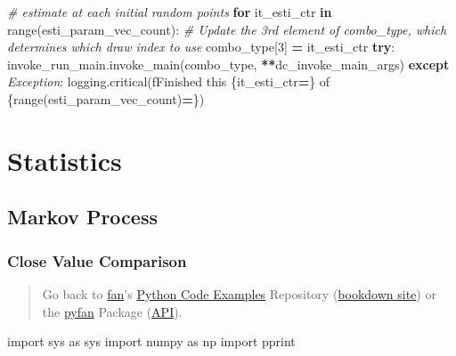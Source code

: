 \documentclass[
]{book}
\newenvironment{Shaded}{\begin{snugshade}}{\end{snugshade}}
\newcommand{\BuiltInTok}[1]{#1}
\newcommand{\CommentTok}[1]{\textcolor[rgb]{0.56,0.35,0.01}{\textit{#1}}}
\newcommand{\ControlFlowTok}[1]{\textcolor[rgb]{0.13,0.29,0.53}{\textbf{#1}}}
\newcommand{\DecValTok}[1]{\textcolor[rgb]{0.00,0.00,0.81}{#1}}
\newcommand{\ImportTok}[1]{#1}
\newcommand{\KeywordTok}[1]{\textcolor[rgb]{0.13,0.29,0.53}{\textbf{#1}}}
\newcommand{\NormalTok}[1]{#1}
\newcommand{\OperatorTok}[1]{\textcolor[rgb]{0.81,0.36,0.00}{\textbf{#1}}}
\newcommand{\PreprocessorTok}[1]{\textcolor[rgb]{0.56,0.35,0.01}{\textit{#1}}}
\newcommand{\SpecialCharTok}[1]{\textcolor[rgb]{0.00,0.00,0.00}{#1}}
\newcommand{\SpecialStringTok}[1]{\textcolor[rgb]{0.31,0.60,0.02}{#1}}
\begin{document}
\begin{Shaded}
\begin{Highlighting}[]
\CommentTok{\# estimate at each initial random points}
\ControlFlowTok{for}\NormalTok{ it\_esti\_ctr }\KeywordTok{in} \BuiltInTok{range}\NormalTok{(esti\_param\_vec\_count):}
    \CommentTok{\# Update the 3rd element of combo\_type, which determines which draw index to use}
\NormalTok{    combo\_type[}\DecValTok{3}\NormalTok{] }\OperatorTok{=}\NormalTok{ it\_esti\_ctr}
    \ControlFlowTok{try}\NormalTok{:}
\NormalTok{        invoke\_run\_main.invoke\_main(combo\_type, }\OperatorTok{**}\NormalTok{dc\_invoke\_main\_args)}
    \ControlFlowTok{except} \PreprocessorTok{Exception}\NormalTok{:}
\NormalTok{        logging.critical(}\SpecialStringTok{f\textquotesingle{}Finished this }\SpecialCharTok{\{}\NormalTok{it\_esti\_ctr}\OperatorTok{=}\SpecialCharTok{\}}\SpecialStringTok{ of }\SpecialCharTok{\{}\BuiltInTok{range}\NormalTok{(esti\_param\_vec\_count)}\OperatorTok{=}\SpecialCharTok{\}}\SpecialStringTok{\textquotesingle{}}\NormalTok{)}
\end{Highlighting}
\end{Shaded}

\hypertarget{statistics}{%
\chapter{Statistics}\label{statistics}}

\hypertarget{markov-process}{%
\section{Markov Process}\label{markov-process}}

\hypertarget{close-value-comparison}{%
\subsection{Close Value Comparison}\label{close-value-comparison}}

\begin{quote}
Go back to \href{http://fanwangecon.github.io/}{fan}'s \href{https://fanwangecon.github.io/Py4Econ/}{Python Code Examples} Repository (\href{https://fanwangecon.github.io/Py4Econ/bookdown}{bookdown site}) or the \href{https://pyfan.readthedocs.io/en/latest/}{pyfan} Package (\href{https://pyfan.readthedocs.io/en/latest/reference.html}{API}).
\end{quote}

\begin{Shaded}
\begin{Highlighting}[]
\ImportTok{import}\NormalTok{ sys }\ImportTok{as}\NormalTok{ sys}
\ImportTok{import}\NormalTok{ numpy }\ImportTok{as}\NormalTok{ np}
\ImportTok{import}\NormalTok{ pprint}
\end{Highlighting}
\end{Shaded}
\end{document}
